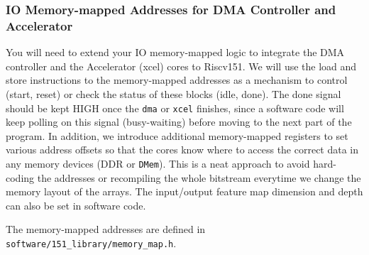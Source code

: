 \documentclass[11pt]{article}
\begin{document}
\subsubsection{IO Memory-mapped Addresses for DMA Controller and Accelerator}

You will need to extend your IO memory-mapped logic to integrate the DMA controller and the Accelerator (xcel) cores to Riscv151. We will use the load and store instructions to the memory-mapped addresses as a mechanism to control (start, reset) or check the status of these blocks (idle, done). The done signal should be kept HIGH once the \texttt{dma} or \texttt{xcel} finishes, since a software code will keep polling on this signal (busy-waiting) before moving to the next part of the program. In addition, we introduce additional memory-mapped registers to set various address offsets so that the cores know where to access the correct data in any memory devices (DDR or \texttt{DMem}). This is a neat approach to avoid hard-coding the addresses or recompiling the whole bitstream everytime we change the memory layout of the arrays. The input/output feature map dimension and depth can also be set in software code.

The memory-mapped addresses are defined in \verb|software/151_library/memory_map.h|.
\end{document}
